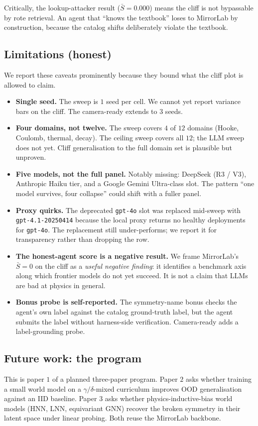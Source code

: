 \documentclass{article}
\begin{document}
Critically, the lookup-attacker result ($\bar S = 0.000$) means the
cliff is not bypassable by rote retrieval. An agent that ``knows the
textbook'' loses to MirrorLab by construction, because the catalog
shifts deliberately violate the textbook.

\subsection{Limitations (honest)}
We report these caveats prominently because they bound what the cliff
plot is allowed to claim.

\begin{itemize}\itemsep0pt
\item \textbf{Single seed.} The sweep is $1$ seed per cell. We cannot
      yet report variance bars on the cliff. The camera-ready extends
      to $3$ seeds.
\item \textbf{Four domains, not twelve.} The sweep covers $4$ of $12$
      domains (Hooke, Coulomb, thermal, decay). The ceiling sweep
      covers all $12$; the LLM sweep does not yet. Cliff generalisation
      to the full domain set is plausible but unproven.
\item \textbf{Five models, not the full panel.} Notably missing:
      DeepSeek (R3 / V3), Anthropic Haiku tier, and a Google Gemini
      Ultra-class slot. The pattern ``one model survives, four
      collapse'' could shift with a fuller panel.
\item \textbf{Proxy quirks.} The deprecated \texttt{gpt-4o} slot was
      replaced mid-sweep with \texttt{gpt-4.1-20250414} because the
      local proxy returns no healthy deployments for \texttt{gpt-4o}.
      The replacement still under-performs; we report it for
      transparency rather than dropping the row.
\item \textbf{The honest-agent score is a negative result.} We frame
      MirrorLab's $\bar S = 0$ on the cliff as a \emph{useful negative
      finding}: it identifies a benchmark axis along which frontier
      models do not yet succeed. It is not a claim that LLMs are bad
      at physics in general.
\item \textbf{Bonus probe is self-reported.} The symmetry-name bonus
      checks the agent's own label against the catalog ground-truth
      label, but the agent submits the label without harness-side
      verification. Camera-ready adds a label-grounding probe.
\end{itemize}

\subsection{Future work: the program}
This is paper $1$ of a planned three-paper program. Paper $2$ asks
whether training a small world model on a $\gamma/\delta$-mixed
curriculum improves OOD generalisation against an IID baseline.
Paper $3$ asks whether physics-inductive-bias world models (HNN, LNN,
equivariant GNN) recover the broken symmetry in their latent space
under linear probing. Both reuse the MirrorLab backbone.
\end{document}
